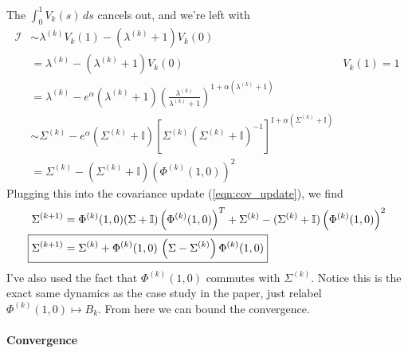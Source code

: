 \documentclass[12pt,fleqn]{article}
\numberwithin{equation}{section}
\begin{document}
The $\int_0^1 V_k(s)\,ds$ cancels out, and we're left with
\begin{align}
	\mathcal I & \sim \lambda^{(k)}  V_k(1) - (\lambda^{(k)}  + 1) V_k(0)\\
	& = \lambda^{(k)}  - (\lambda^{(k)}  + 1) V_k(0) & V_k(1) = 1\\
	& = \lambda^{(k)}  - e^{\alpha} (\lambda^{(k)}  + 1) \left( \frac{\lambda^{(k)}}{\lambda^{(k)} + 1 } \right)^{1 + \alpha (\lambda^{(k)} +1)}\\
	& \sim \Sigma^{(k)} - e^{\alpha} (\Sigma^{(k)} + \mathbb I) [\Sigma^{(k)} (\Sigma^{(k)} +\mathbb I)^{-1}]^{\mathbb I + \alpha(\Sigma^{(k)} + \mathbb I)}\\
	& = \Sigma^{(k)} - (\Sigma^{(k)} + \mathbb I) \left( \Phi^{(k)} (1,0)\right)^2
\end{align}
Plugging this into the covariance update (\ref{eqn:cov_update}), we find
\begin{align}
	\Sigma^{(k+1)} & =  \Phi^{(k)} (1,0) (\Sigma + \mathbb I)  \left( \Phi^{(k)} (1,0)\right)^T + \Sigma^{(k)} - (\Sigma^{(k)} + \mathbb I) \left( \Phi^{(k)} (1,0)\right)^2\\
	\Aboxed{\Sigma^{(k+1)} & = \Sigma^{(k)} + \Phi^{(k)}(1,0) \, \left(\Sigma - \Sigma^{(k)} \right) \Phi^{(k)} (1,0)} \label{eqn:cov_update_linearnoise}
\end{align}
I've also used the fact that $\Phi^{(k)}(1,0)$ commutes with $\Sigma^{(k)}$. Notice this is the exact same dynamics as the case study in the paper, just relabel $\Phi^{(k)}(1,0)  \mapsto B_k$. From here we can bound the convergence. 

\paragraph{Convergence}
\end{document}
